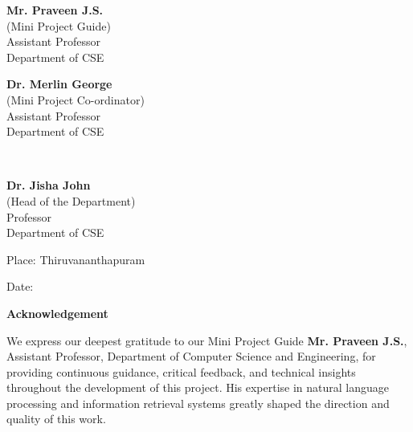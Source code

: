\documentclass[12pt,a4paper]{report}
\begin{document}
\begin{samepage}
\begin{singlespacing}
\hspace*{-0.25in}
\parbox{3in}{
  \noindent \textbf{Mr. Praveen J.S.} \\
  \noindent (Mini Project Guide) \\
  \noindent Assistant Professor\\
  \noindent Department of CSE\\
}
\hspace*{0.7in}
\parbox{2.5in}{
  \noindent \textbf{Dr. Merlin George} \\
  \noindent (Mini Project Co-ordinator)\\
  \noindent Assistant Professor\\
  \noindent Department of CSE\\
}\\
\end{singlespacing}
\begin{singlespacing}
\hspace*{1.7in}
\parbox{2.5in}{
  \noindent \textbf{Dr. Jisha John} \\
  \noindent (Head of the Department)\\
  \noindent Professor\\
  \noindent Department of CSE\\
}
\end{singlespacing}
\begin{singlespacing}
\vspace{0.05in}
\hspace*{-0.25in}
\parbox{2.5in}{\noindent Place: Thiruvananthapuram\\}
\hspace*{1.5in}
\parbox{2.5in}{\noindent Date:\\}
\end{singlespacing}
\end{samepage}

\begin{center}
  {\Large \textbf{Acknowledgement}}\\[0.5cm]
\end{center}
\vspace*{0.5in}

We express our deepest gratitude to our Mini Project Guide \textbf{Mr. Praveen J.S.}, Assistant Professor, Department of Computer Science and Engineering, for providing continuous guidance, critical feedback, and technical insights throughout the development of this project. His expertise in natural language processing and information retrieval systems greatly shaped the direction and quality of this work.
\end{document}
